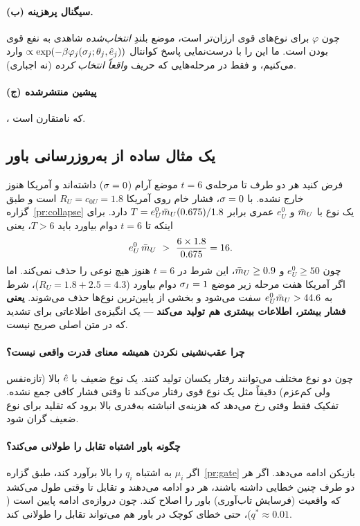 \documentclass[12pt,a4paper]{article}
\begin{document}
\paragraph{(ب) سیگنال پرهزینه.}
چون $\varphi$ برای نوع‌های قوی ارزان‌تر است، موضع بلندِ \emph{انتخاب‌شده}
شاهدی به نفع قوی بودن است. ما این را با درست‌نمایی پاسخ کوانتال
$\propto\exp(-\beta\varphi_j(\sig_j;\theta_j,\ehat_j))$ وارد می‌کنیم، و فقط
در مرحله‌هایی که حریف \emph{واقعاً انتخاب کرده} (نه  اجباری).

\paragraph{(ج) پیشین منتشرشده}، که نامتقارن است.

\subsection{یک مثال ساده از به‌روزرسانی باور}

فرض کنید هر دو طرف تا مرحله‌ی $t=6$ موضع آرام ($\sig=0$) داشته‌اند و آمریکا
هنوز خارج نشده. با $\sig=0$، فشار خام روی آمریکا
$R_U=c_{0U}=1.8$ است و طبق گزاره~\ref{pr:collapse} یک نوع با
$\mbar_U$ و $e_U^0$ عمری برابر
$T=e_U^0\mbar_U(0.675)/1.8$ دارد. برای اینکه تا $t=6$ دوام بیاورد باید
$T>6$، یعنی
\[
  e_U^0\,\mbar_U\ >\ \frac{6\times1.8}{0.675}=16 .
\]
چون $e_U^0\ge50$ و $\mbar_U\ge0.9$، این شرط در $t=6$ هنوز هیچ نوعی را حذف
نمی‌کند. اما اگر آمریکا هفت مرحله زیر موضع $\sig_I=1$ دوام بیاورد
($R_U=1.8+2.5=4.3$)، شرط به $e_U^0\mbar_U>44.6$ سفت می‌شود و بخشی از
پایین‌ترین نوع‌ها حذف می‌شوند. \textbf{یعنی فشار بیشتر، اطلاعات بیشتری هم
تولید می‌کند} — یک انگیزه‌ی اطلاعاتی برای تشدید که در متن اصلی صریح نیست.

\paragraph{چرا عقب‌نشینی نکردن همیشه معنای قدرت واقعی نیست؟}
چون دو نوع مختلف می‌توانند رفتار یکسان تولید کنند. یک نوع ضعیف با $\ehat$
بالا (تازه‌نفس ولی کم‌عزم) دقیقاً مثل یک نوع قوی رفتار می‌کند تا وقتی فشار
کافی جمع نشده. تفکیک فقط وقتی رخ می‌دهد که هزینه‌ی انباشته به‌قدری بالا برود
که تقلید برای نوع ضعیف گران شود.

\paragraph{چگونه باور اشتباه تقابل را طولانی می‌کند؟}
اگر $\mu_i$ به اشتباه $q_i$ را بالا برآورد کند، طبق
گزاره~\ref{pr:gate} بازیکن ادامه می‌دهد. اگر هر دو طرف چنین خطایی
داشته باشند، هر دو ادامه می‌دهند و تقابل تا وقتی طول می‌کشد که واقعیت
(فرسایش تاب‌آوری) باور را اصلاح کند. چون دروازه‌ی ادامه پایین است
(‏$q^\ast\approx0.01$)، حتی خطای کوچک در باور هم می‌تواند تقابل را طولانی
کند.
\end{document}
